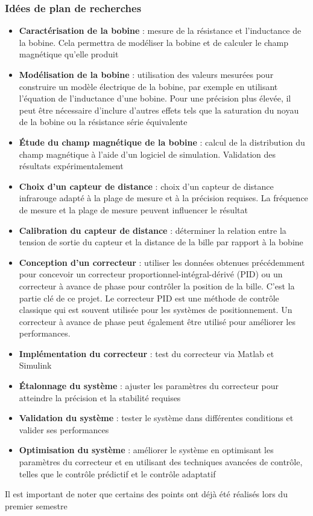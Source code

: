\documentclass[11pt,a4paper]{article}
\begin{document}
\subsubsection{Idées de plan de recherches}
\begin{itemize}
\item \textbf{Caractérisation de la bobine} : mesure de la résistance et l'inductance de la bobine. Cela permettra de modéliser la bobine et de calculer le champ magnétique qu'elle produit
\item \textbf{Modélisation de la bobine} : utilisation des valeurs mesurées pour construire un modèle électrique de la bobine, par exemple en utilisant l'équation de l'inductance d'une bobine. Pour une précision plus élevée, il peut être nécessaire d'inclure d'autres effets tels que la saturation du noyau de la bobine ou la résistance série équivalente
\item \textbf{Étude du champ magnétique de la bobine} : calcul de la distribution du champ magnétique à l'aide d'un logiciel de simulation. Validation des résultats expérimentalement
\item \textbf{Choix d'un capteur de distance} : choix d'un capteur de distance infrarouge adapté à la plage de mesure et à la précision requises. La fréquence de mesure et la plage de mesure peuvent influencer le résultat
\item \textbf{Calibration du capteur de distance} : déterminer la relation entre la tension de sortie du capteur et la distance de la bille par rapport à la bobine
\item \textbf{Conception d'un correcteur } : utiliser les données obtenues précédemment pour concevoir un correcteur proportionnel-intégral-dérivé (PID) ou un correcteur à avance de phase pour contrôler la position de la bille. C'est la partie clé de ce projet. Le correcteur PID est une méthode de contrôle classique qui est souvent utilisée pour les systèmes de positionnement. Un correcteur à avance de phase peut également être utilisé pour améliorer les performances.
\item \textbf{Implémentation du correcteur } : test du correcteur via Matlab et Simulink
\item \textbf{Étalonnage du système} : ajuster les paramètres du correcteur pour atteindre la précision et la stabilité requises
\item \textbf{Validation du système} : tester le système dans différentes conditions et valider ses performances
\item \textbf{Optimisation du système} : améliorer le système en optimisant les paramètres du correcteur et en utilisant des techniques avancées de contrôle, telles que le contrôle prédictif et le contrôle adaptatif
\end{itemize}
\medskip
Il est important de noter que certains des points ont déjà été réalisés lors du premier semestre
\end{document}
